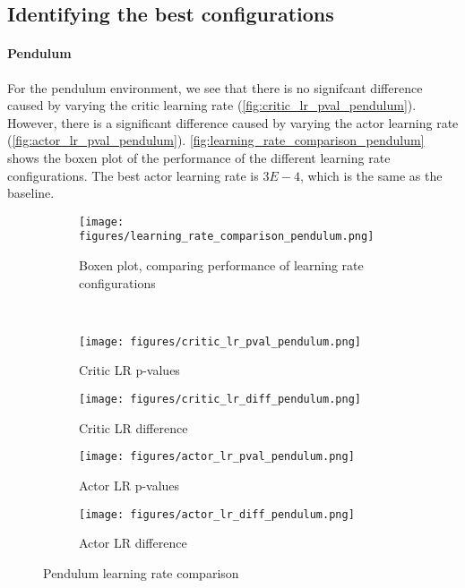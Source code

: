 \documentclass{article}
\begin{document}
\subsection{Identifying the best configurations}

\paragraph{Pendulum}
For the pendulum environment, we see that there is no signifcant difference caused by varying the critic learning rate (\autoref{fig:critic_lr_pval_pendulum}). However, there is a significant difference caused by varying the actor learning rate (\autoref{fig:actor_lr_pval_pendulum}). \autoref{fig:learning_rate_comparison_pendulum} shows the boxen plot of the performance of the different learning rate configurations. The best actor learning rate is \(3E-4\), which is the same as the baseline.

\begin{figure}[h!]
    \centering
    \begin{subfigure}{0.4\textwidth}
        \centering
        \texttt{[image: figures/learning\_rate\_comparison\_pendulum.png]}
        \captionsetup{justification=centering}
        \caption{Boxen plot, comparing performance of learning rate configurations}
        \label{fig:learning_rate_comparison_pendulum}
    \end{subfigure}
    \\
    \begin{subfigure}{0.24\textwidth}
        \centering
        \texttt{[image: figures/critic\_lr\_pval\_pendulum.png]}
        \captionsetup{justification=centering}
        \caption{Critic LR p-values}
        \label{fig:critic_lr_pval_pendulum}
    \end{subfigure}
    \begin{subfigure}{0.24\textwidth}
        \centering
        \texttt{[image: figures/critic\_lr\_diff\_pendulum.png]}
        \captionsetup{justification=centering}
        \caption{Critic LR difference}
        \label{fig:critic_lr_diff_pendulum}
    \end{subfigure}
    \begin{subfigure}{0.24\textwidth}
        \centering
        \texttt{[image: figures/actor\_lr\_pval\_pendulum.png]}
        \captionsetup{justification=centering}
        \caption{Actor LR p-values}
        \label{fig:actor_lr_pval_pendulum}
    \end{subfigure}
    \begin{subfigure}{0.24\textwidth}
        \centering
        \texttt{[image: figures/actor\_lr\_diff\_pendulum.png]}
        \captionsetup{justification=centering}
        \caption{Actor LR difference}
        \label{fig:actor_lr_diff_pendulum}
    \end{subfigure}
    \caption{Pendulum learning rate comparison}
    \label{fig:pendulum_analysis}
\end{figure}
\end{document}
